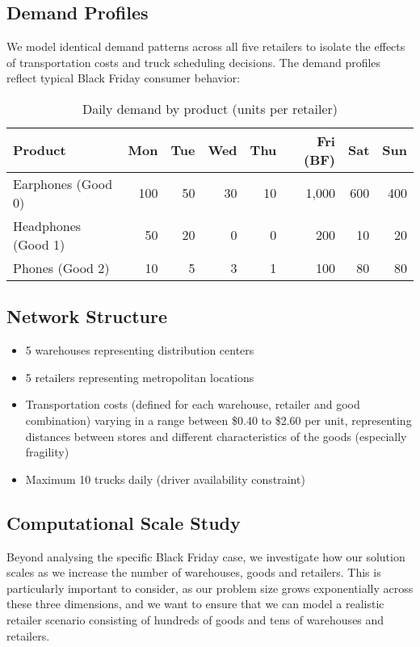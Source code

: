 \documentclass[a4paper,12pt]{article}
\begin{document}
\subsection{Demand Profiles}\label{subsec:demand-profiles}

We model identical demand patterns across all five retailers to isolate the effects of transportation costs and truck scheduling decisions.
The demand profiles reflect typical Black Friday consumer behavior:

\begin{table}[h]
\centering
\caption{Daily demand by product (units per retailer)}
\begin{tabular}{lrrrrrrr}
\toprule
Product & Mon & Tue & Wed & Thu & Fri (BF) & Sat & Sun \\
\midrule
Earphones (Good 0) & 100 & 50 & 30 & 10 & 1,000 & 600 & 400 \\
Headphones (Good 1) & 50 & 20 & 0 & 0 & 200 & 10 & 20 \\
Phones (Good 2) & 10 & 5 & 3 & 1 & 100 & 80 & 80 \\
\bottomrule
\end{tabular}\label{tab:table2}
\end{table}

\subsection{Network Structure}\label{subsec:network-structure}
\begin{itemize}
    \item 5 warehouses representing distribution centers
    \item 5 retailers representing metropolitan locations
    \item Transportation costs (defined for each warehouse, retailer and good combination) varying in a range between \$0.40 to \$2.60 per unit, representing distances between stores and different characteristics of the goods (especially fragility)
    \item Maximum 10 trucks daily (driver availability constraint)
\end{itemize}

\subsection{Computational Scale Study}\label{subsec:computational-scale-study}

Beyond analysing the specific Black Friday case, we investigate how our solution scales as we increase the number of warehouses, goods and retailers.
This is particularly important to consider, as our problem size grows exponentially across these three dimensions, and we want to ensure that we can model a realistic retailer scenario consisting of hundreds of goods and tens of warehouses and retailers.
\end{document}
